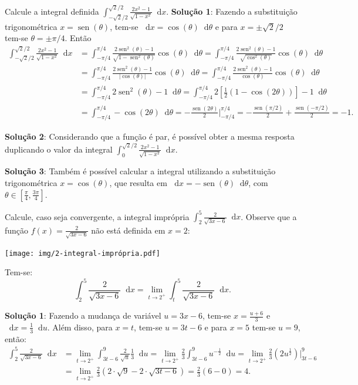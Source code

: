 \documentclass[12pt,a4paper]{article}
\newcommand*\diff{\mathop{}\!\mathrm{d}}
\newcommand*\sen{\operatorname{sen}}
\begin{document}
\begin{ExerciseList}
\Exercise[title={2,5}] Calcule a integral definida $\displaystyle\int_{-\sqrt{2}/2}^{\sqrt{2}/2} \frac{2x^2-1}{\sqrt{1-x^2}} \diff{x}$.
\Answer \textbf{Solução 1}: Fazendo a substituição trigonométrica $x = \sen(\theta)$, tem-se $\diff{x} = \cos(\theta) \diff{\theta}$ e para $x=\pm \sqrt{2}/2$ tem-se $\theta=\pm \pi/4$. Então
\begin{align*}
  \int_{-\sqrt{2}/2}^{\sqrt{2}/2} \frac{2x^2-1}{\sqrt{1-x^2}} \diff{x}
  & = \int_{-\pi/4}^{\pi/4} \frac{2\sen^2(\theta)-1}{\sqrt{1-\sen^2(\theta)}} \cos(\theta) \diff{\theta}
  = \int_{-\pi/4}^{\pi/4} \frac{2\sen^2(\theta)-1}{\sqrt{\cos^2(\theta)}} \cos(\theta) \diff{\theta}\\
  & = \int_{-\pi/4}^{\pi/4} \frac{2\sen^2(\theta)-1}{|\cos(\theta)|} \cos(\theta) \diff{\theta}
  = \int_{-\pi/4}^{\pi/4} \frac{2\sen^2(\theta)-1}{\cos(\theta)} \cos(\theta) \diff{\theta}\\
  & = \int_{-\pi/4}^{\pi/4} 2\sen^2(\theta)-1 \diff{\theta}
    = \int_{-\pi/4}^{\pi/4} 2\left[\frac{1}{2}\left(1-\cos(2\theta)\right)\right]-1 \diff{\theta}\\
  & = \int_{-\pi/4}^{\pi/4} -\cos(2\theta) \diff{\theta}
    = -\frac{\sen(2\theta)}{2}\bigg|_{-\pi/4}^{\pi/4}
    = -\frac{\sen(\pi/2)}{2} + \frac{\sen(-\pi/2)}{2}
    = -1.
\end{align*}

\textbf{Solução 2}: Considerando que a função é par, é possível obter a mesma resposta duplicando o valor da integral
$\displaystyle\int_{0}^{\sqrt{2}/2} \frac{2x^2-1}{\sqrt{1-x^2}} \diff{x}$.

\textbf{Solução 3}: Também é possível calcular a integral utilizando a substituição trigonométrica $x = \cos(\theta)$, que resulta em $\diff{x} = -\sen(\theta)\diff{\theta}$, com $\theta \in [\frac{\pi}{4}, \frac{3\pi}{4}]$.

\Exercise[title={2,5}] Calcule, caso seja convergente, a integral imprópria $\displaystyle\int_2^5 \frac{2}{\sqrt{3x-6}} \diff{x}$.
\Answer Observe que a função $f(x) = \frac{2}{\sqrt{3x-6}}$ não está definida em $x=2$:
\begin{center}
\texttt{[image: img/2-integral-imprópria.pdf]}
\end{center}

Tem-se:
\[
  \int_2^5 \frac{2}{\sqrt{3x-6}} \diff{x}
  = \lim_{t\to 2^+} \int_t^5 \frac{2}{\sqrt{3x-6}} \diff{x}.
\]

\textbf{Solução 1}: Fazendo a mudança de variável $u = 3x - 6$, tem-se $x = \frac{u+6}{3}$ e $\diff{x} = \frac{1}{3} \diff{u}$. Além disso, para $x=t$, tem-se $u = 3t-6$ e para $x=5$ tem-se $u=9$, então:
\begin{align*}
  \int_2^5 \frac{2}{\sqrt{3x - 6}} \diff{x}
  & = \lim_{t\to 2^+} \int_{3t - 6}^9 \frac{2}{\sqrt{u}} \frac{1}{3}\diff{u}
  = \lim_{t\to 2^+} \frac{2}{3} \int_{3t - 6}^9 u^{-\frac{1}{2}} \diff{u}
  = \lim_{t\to 2^+} \frac{2}{3} (2u^{\frac{1}{2}})\bigg|_{3t - 6}^9\\
  & = \lim_{t\to 2^+} \frac{2}{3} (2\cdot \sqrt{9} - 2\cdot \sqrt{3t - 6})
  = \frac{2}{3} (6 - 0)
  = 4.
\end{align*}


\end{ExerciseList}
\end{document}
